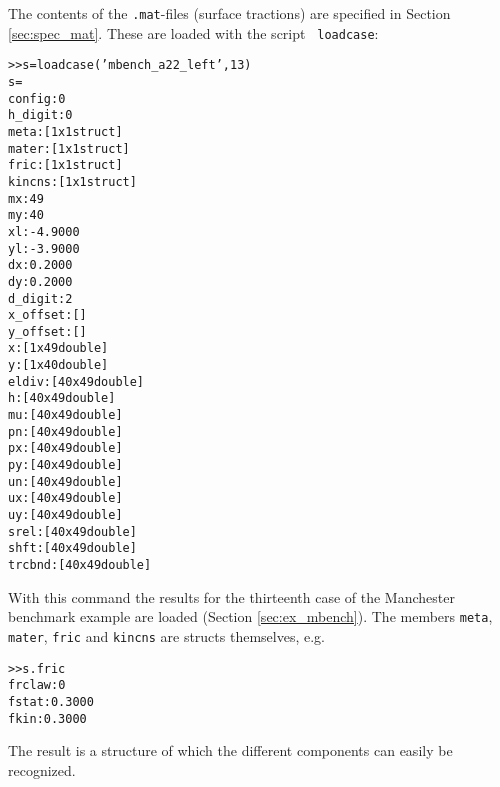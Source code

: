 \documentclass[12pt]{report}
\begin{document}
The contents of the {\tt .mat}-files (surface tractions) are specified in
Section \ref{sec:spec_mat}. These are loaded with the script {\tt
loadcase}:
\begin{alltt}\small
>> s = loadcase('mbench_a22_left', 13)
s = 
       config: 0
      h_digit: 0
         meta: [1x1 struct]
        mater: [1x1 struct]
         fric: [1x1 struct]
       kincns: [1x1 struct]
           mx: 49
           my: 40
           xl: -4.9000
           yl: -3.9000
           dx: 0.2000
           dy: 0.2000
      d_digit: 2
     x_offset: []
     y_offset: []
            x: [1x49 double]
            y: [1x40 double]
        eldiv: [40x49 double]
            h: [40x49 double]
           mu: [40x49 double]
           pn: [40x49 double]
           px: [40x49 double]
           py: [40x49 double]
           un: [40x49 double]
           ux: [40x49 double]
           uy: [40x49 double]
         srel: [40x49 double]
         shft: [40x49 double]
       trcbnd: [40x49 double]
\end{alltt}
With this command the results for the thirteenth case of the Manchester
benchmark example are loaded (Section \ref{sec:ex_mbench}). The members
{\tt meta}, {\tt mater}, {\tt fric} and {\tt kincns} are
structs themselves, e.g.
\begin{alltt}\small
>> s.fric
    frclaw: 0
     fstat: 0.3000
      fkin: 0.3000
\end{alltt}
The result is a structure of which the different components can easily be
recognized. 
\end{document}
